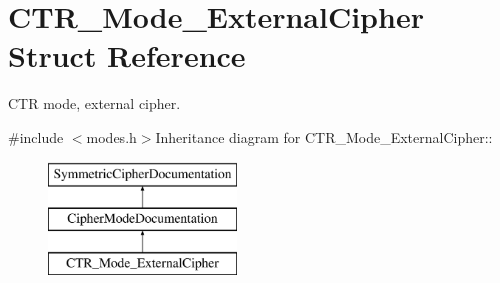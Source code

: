 \hypertarget{struct_c_t_r___mode___external_cipher}{
\section{CTR\_\-Mode\_\-ExternalCipher Struct Reference}
\label{struct_c_t_r___mode___external_cipher}
}


CTR mode, external cipher.  


{\ttfamily \#include $<$modes.h$>$}Inheritance diagram for CTR\_\-Mode\_\-ExternalCipher::\begin{figure}[H]
\begin{center}
\leavevmode
\includegraphics[height=3cm]{struct_c_t_r___mode___external_cipher}
\end{center}
\end{figure}
